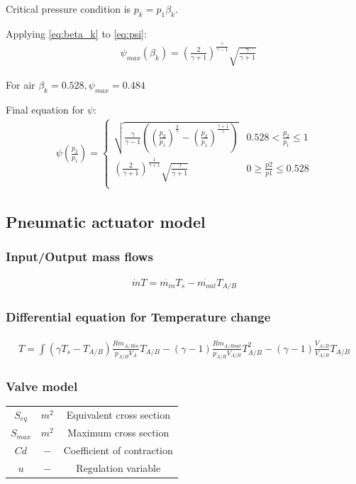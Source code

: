 \documentclass[class=article, crop=false]{standalone}
\begin{document}
Critical pressure condition is $p_k = p_1 \beta_k$.

Applying \ref{eq:beta_k} to \ref{eq:psi}:
\begin{align}
    &\psi_{max} (\beta_k) = 
    \left(\frac{2}{\gamma+1}\right)^\frac{\gamma}{\gamma-1}\sqrt{\frac{\gamma}{\gamma+1}}
\end{align}

For air $\beta_k = 0.528, \psi_{max} = 0.484$


Final equation for $\psi$:
\begin{align}
    \psi\left(\frac{p_2}{p_1}\right) = 
    \begin{cases}
    \sqrt{\frac{\gamma}{\gamma-1}\left(\left(\frac{p_2}{p_1}\right)^\frac{2}{\gamma} -
    \left(\frac{p_2}{p_1}\right)^\frac{\gamma + 1}{\gamma}\right)} & 0.528
    <\frac{p_2}{p_1} \le 1 \\
    \left(\frac{2}{\gamma +1}\right)^{\frac{1}{\gamma+1}}
    \sqrt{\frac{\gamma}{\gamma +1}} & 0 \ge \frac{p2}{p1} \le 0.528\\
    \end{cases}
\end{align}



\subsection{Pneumatic actuator model}

\subsubsection{Input/Output mass flows}

\begin{align}
    \dot{m}T = \dot{m_{in}}T_s - \dot{m_{out}}T_{A/B}
\end{align}


\subsubsection{Differential equation for Temperature change}
\begin{align}
    T = \int{ (\gamma T_s - T_{A/B})
        \frac{R\dot{m}_{A/Bin}}{p_{A/B}V_{A}}T_{A/B} -
    (\gamma-1)\frac{R\dot{m}_{A/Bout}}{p_{A/B}V_{A/B}} T_{A/B}^2 -
(\gamma-1)\frac{\dot{V}_{A/B}}{V_{A/B}}T_{A/B}}
\end{align}


\subsubsection{Valve model} %
\begin{tabular}{ |c|c|c| }
    \hline
    $S_{eq}$                & $m^2$         & Equivalent cross section \\
    $S_{max}$               & $m^2$         & Maximum cross section \\
    $Cd$                    & $-$           & Coefficient of contraction \\
    $u$                     & $-$           & Regulation variable \\
    \hline
\end{tabular}
\end{document}
